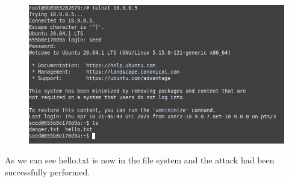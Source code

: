 \documentclass[12pt]{article}
\begin{document}
\begin{figure}
  \includegraphics*{Task4afterAttack.png}
\end{figure}

As we can see hello.txt is now in the file system and the attack had been successfully performed.
\end{document}
